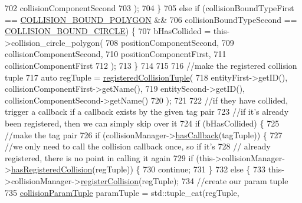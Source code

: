 \begin{DoxyCode}
702                     collisionComponentSecond
703                     );
704             \}
705             \textcolor{keywordflow}{else} \textcolor{keywordflow}{if} (collisionBoundTypeFirst == \hyperlink{_a_e___attributes_8h_a71ab491ab7b44947b07d7b05974387d9}{COLLISION\_BOUND\_POLYGON} &&
706                 collisionBoundTypeSecond == \hyperlink{_a_e___attributes_8h_a50b28a4aee049371f130f3eafa9c942f}{COLLISION\_BOUND\_CIRCLE}) \{
707                 bHasCollided = this->collision\_circle\_polygon(
708                     positionComponentSecond,
709                     collisionComponentSecond,
710                     positionComponentFirst,
711                     collisionComponentFirst
712                     );
713             \}
714 
715 
716             \textcolor{comment}{//make the registered collision tuple}
717             \textcolor{keyword}{auto} regTuple = \hyperlink{_collision_manager_8h_ada58768e1593bf8b68e443116782f54e}{registeredCollisionTuple}(
718                 entityFirst->getID(), collisionComponentFirst->getName(),
719                 entitySecond->getID(), collisionComponentSecond->getName()
720                 );
721 
722             \textcolor{comment}{//if they have collided, trigger a callback if a callback exists by the given tag pair}
723             \textcolor{comment}{//if it's already been registered, then we can simply skip over it}
724             \textcolor{keywordflow}{if} (bHasCollided) \{
725                 \textcolor{comment}{//make the tag pair}
726                 \textcolor{keywordflow}{if} (collisionManager->\hyperlink{class_collision_manager_a98395760494f7976f75c1d50072dcc5a}{hasCallback}(tagTuple)) \{
727                     \textcolor{comment}{//we only need to call the collision callback once, so if it's}
728                     \textcolor{comment}{// already registered, there is no point in calling it again}
729                     \textcolor{keywordflow}{if} (this->collisionManager->\hyperlink{class_collision_manager_a3dd0b50dcdee6bfd6ddcdaf7eec0c66b}{hasRegisteredCollision}(regTuple)) \{
730                         \textcolor{keywordflow}{continue};
731                     \}
732                     \textcolor{keywordflow}{else} \{
733                         this->collisionManager->\hyperlink{class_collision_manager_abe04add405129184fdb5b76c079fd34a}{registerCollision}(regTuple);
734                         \textcolor{comment}{//create our param tuple}
735                         \hyperlink{_collision_manager_8h_aa4e5677732161da0be677d67bec17ea6}{collisionParamTuple} paramTuple = std::tuple\_cat(regTuple, 

\end{DoxyCode}
